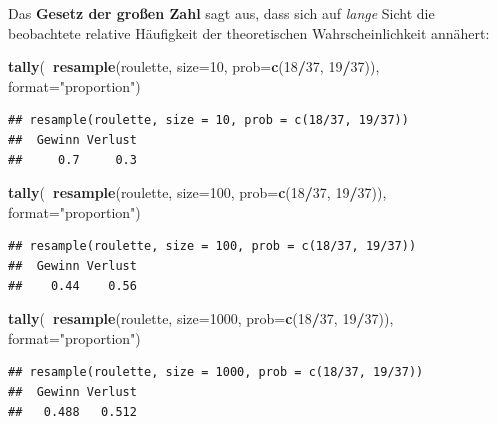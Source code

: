 \documentclass[12pt,ngerman,paper=a4,pagesize,DIV=13]{scrreprt}
\newenvironment{Shaded}{\begin{snugshade}}{\end{snugshade}}
\newcommand{\DataTypeTok}[1]{\textcolor[rgb]{0.13,0.29,0.53}{#1}}
\newcommand{\DecValTok}[1]{\textcolor[rgb]{0.00,0.00,0.81}{#1}}
\newcommand{\KeywordTok}[1]{\textcolor[rgb]{0.13,0.29,0.53}{\textbf{#1}}}
\newcommand{\NormalTok}[1]{#1}
\newcommand{\OperatorTok}[1]{\textcolor[rgb]{0.81,0.36,0.00}{\textbf{#1}}}
\newcommand{\StringTok}[1]{\textcolor[rgb]{0.31,0.60,0.02}{#1}}
\begin{document}
Das \textbf{Gesetz der großen Zahl} sagt aus, dass sich auf \emph{lange}
Sicht die beobachtete relative Häufigkeit der theoretischen
Wahrscheinlichkeit annähert:

\begin{Shaded}
\begin{Highlighting}[]
\KeywordTok{tally}\NormalTok{(}\OperatorTok{~}\KeywordTok{resample}\NormalTok{(roulette, }\DataTypeTok{size=}\DecValTok{10}\NormalTok{, }\DataTypeTok{prob=}\KeywordTok{c}\NormalTok{(}\DecValTok{18}\OperatorTok{/}\DecValTok{37}\NormalTok{, }\DecValTok{19}\OperatorTok{/}\DecValTok{37}\NormalTok{)), }\DataTypeTok{format=}\StringTok{"proportion"}\NormalTok{)}
\end{Highlighting}
\end{Shaded}

\begin{verbatim}
## resample(roulette, size = 10, prob = c(18/37, 19/37))
##  Gewinn Verlust 
##     0.7     0.3
\end{verbatim}

\begin{Shaded}
\begin{Highlighting}[]
\KeywordTok{tally}\NormalTok{(}\OperatorTok{~}\KeywordTok{resample}\NormalTok{(roulette, }\DataTypeTok{size=}\DecValTok{100}\NormalTok{, }\DataTypeTok{prob=}\KeywordTok{c}\NormalTok{(}\DecValTok{18}\OperatorTok{/}\DecValTok{37}\NormalTok{, }\DecValTok{19}\OperatorTok{/}\DecValTok{37}\NormalTok{)), }\DataTypeTok{format=}\StringTok{"proportion"}\NormalTok{)}
\end{Highlighting}
\end{Shaded}

\begin{verbatim}
## resample(roulette, size = 100, prob = c(18/37, 19/37))
##  Gewinn Verlust 
##    0.44    0.56
\end{verbatim}

\begin{Shaded}
\begin{Highlighting}[]
\KeywordTok{tally}\NormalTok{(}\OperatorTok{~}\KeywordTok{resample}\NormalTok{(roulette, }\DataTypeTok{size=}\DecValTok{1000}\NormalTok{, }\DataTypeTok{prob=}\KeywordTok{c}\NormalTok{(}\DecValTok{18}\OperatorTok{/}\DecValTok{37}\NormalTok{, }\DecValTok{19}\OperatorTok{/}\DecValTok{37}\NormalTok{)), }\DataTypeTok{format=}\StringTok{"proportion"}\NormalTok{)}
\end{Highlighting}
\end{Shaded}

\begin{verbatim}
## resample(roulette, size = 1000, prob = c(18/37, 19/37))
##  Gewinn Verlust 
##   0.488   0.512
\end{verbatim}
\end{document}
